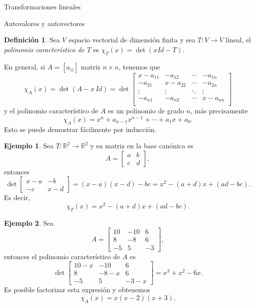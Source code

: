 \documentclass[a4paper,12pt,twoside,spanish]{amsbook}
\theoremstyle{definition}
\newtheorem{definicion}{Definici\'on}[section]
\newtheorem{ejemplo}{Ejemplo}[section]
\theoremstyle{remark}
\newcommand{\R}{\mathbb R}
\begin{document}
\begin{chapter}{Transformaciones lineales}
\begin{section}{Autovalores y autovectores}
\begin{definicion}
			Sea $V$ espacio vectorial de dimensión finita y sea $T: V \to V$ lineal, el  \textit{polinomio característico de $T$} es $\chi_T(x) = \det(x Id-T)$.
		\end{definicion}
	
			
		En general,  si $A = [a_{ij}]$ matriz $n \times n$, tenemos que
		\begin{equation}
		\chi_A(x) = \det(A- x\,Id) = \det
		\begin{bmatrix}
		x -a_{11}&-a_{12}&\cdots&-a_{1n}\\
		-a_{21}&x -a_{22}&\cdots&-a_{2n}\\
		\vdots&\vdots&\ddots&\vdots\\
		-a_{n1}&-a_{n2}&\cdots&x -a_{nn}\\
		\end{bmatrix}
		\end{equation} 
		y el polinomio característico de $A$ es un polinomio  de grado $n$,  más precisamente  
		$$
		\chi_A(x) =x^n + a_{n-1}x^{n-1}+ \cdots + a_1x + a_0.
		$$ 
		Esto se puede demostrar fácilmente por inducción. 
		
		\begin{ejemplo}
			Sea $T: \R^2 \to \R^2$ y su matriz en la base canónica es
			\begin{equation*}
				A = \begin{bmatrix}
					a&b\\c&d
				\end{bmatrix},
			\end{equation*}
		entonces
		\begin{equation*}
				 \det \begin{bmatrix}
				x-a & -b \\ -c &x-d
				\end{bmatrix} = 
				(x-a)(x-d) - bc = x^2 -(a+d)x + (ad -bc).
		\end{equation*}
		Es decir,
		$$
		\chi_T(x) = x^2 -(a+d)x + (ad -bc).
		$$ 
		\end{ejemplo}

	
	
		
		\begin{ejemplo} \label{ej-autovectores}
			Sea
			$$ 
			A=\begin{bmatrix}10&-10&6\\8& -8& 6\\-5& 5& -3\end{bmatrix},
			$$
			entonces el  polinomio característico de $A$ es
			$$
			\det \begin{bmatrix}10-x&-10&6\\8& -8-x& 6\\-5& 5& -3-x\end{bmatrix} = x^3  + x^2 - 6 x .
			$$
			Es posible factorizar esta expresión y obtenemos
			$$
			\chi_A(x) = x (x-2)(x+3).
			$$
		\end{ejemplo}
		

\end{section}
\end{chapter}
\end{document}

